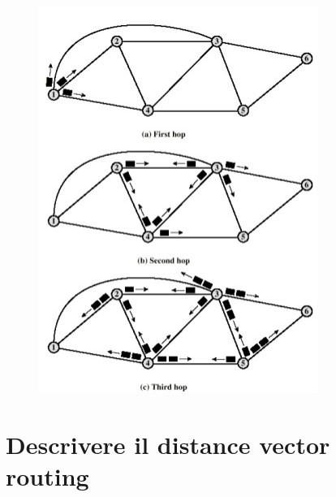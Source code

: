 \begin{figure}[H]
\centering
\includegraphics[scale=0.7]{res/img/32_Flooding.png}
\end{figure}

\section{Descrivere il distance vector routing}

